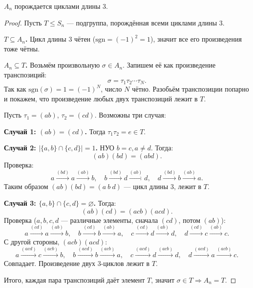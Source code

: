 \begin{lemma}
    $A_n$ порождается циклами длины $3$.
    \begin{proof}
        Пусть $T \leq S_n$ --- подгруппа, порождённая всеми циклами длины $3$.

        \textbf{$T \subseteq A_n$.} Цикл длины $3$ чётен ($\mathrm{sgn} = (-1)^2 = 1$), значит все его произведения тоже чётны.

        \textbf{$A_n \subseteq T$.} Возьмём произвольную $\sigma \in A_n$. Запишем её как произведение транспозиций:
        \[
            \sigma = \tau_1 \tau_2 \cdots \tau_N.
        \]
        Так как $\mathrm{sgn}(\sigma) = 1 = (-1)^N$, число $N$ чётно. Разобьём транспозиции попарно и покажем,
        что произведение любых двух транспозиций лежит в $T$.

        Пусть $\tau_1 = (ab)$, $\tau_2 = (cd)$. Возможны три случая:

        \textbf{Случай 1: $(ab) = (cd)$.} Тогда $\tau_1\tau_2 = e \in T$.

        \textbf{Случай 2: $|\{a,b\}\cap\{c,d\}|=1$.} НУО $b = c, a \ne d$. Тогда:
        \[
            (ab)(bd) = (abd).
        \]
        Проверка:
        \[
            a \xrightarrow{(bd)} a \xrightarrow{(ab)} b, \quad
            b \xrightarrow{(bd)} d \xrightarrow{(ab)} d, \quad
            d \xrightarrow{(bd)} b \xrightarrow{(ab)} a.
        \]
        Таким образом $(ab)(bd) = (a\ b\ d)$ --- цикл длины $3$, лежит в $T$.

        \textbf{Случай 3: $\{a,b\}\cap\{c,d\}=\varnothing$.} Тогда:
        \[
            (ab)(cd) = (acb)(acd).
        \]
        Проверка ($a,b,c,d$ --- различные элементы, сначала $(cd)$, потом $(ab)$):
        \[
            a \xrightarrow{(cd)} a \xrightarrow{(ab)} b, \quad
            b \xrightarrow{(cd)} b \xrightarrow{(ab)} a, \quad
            c \xrightarrow{(cd)} d \xrightarrow{(ab)} d, \quad
            d \xrightarrow{(cd)} c \xrightarrow{(ab)} c.
        \]
        С другой стороны, $(acb)(acd)$:
        \[
            a \xrightarrow{(acd)} c \xrightarrow{(acb)} b, \quad
            b \xrightarrow{(acd)} b \xrightarrow{(acb)} a, \quad
            c \xrightarrow{(acd)} d \xrightarrow{(acb)} d, \quad
            d \xrightarrow{(acd)} a \xrightarrow{(acb)} c.
        \]
        Совпадает.  Произведение двух 3-циклов лежит в $T$.

        Итого, каждая пара транспозиций даёт элемент $T$, значит $\sigma \in T \Rightarrow A_n = T$.
    \end{proof}
\end{lemma}

